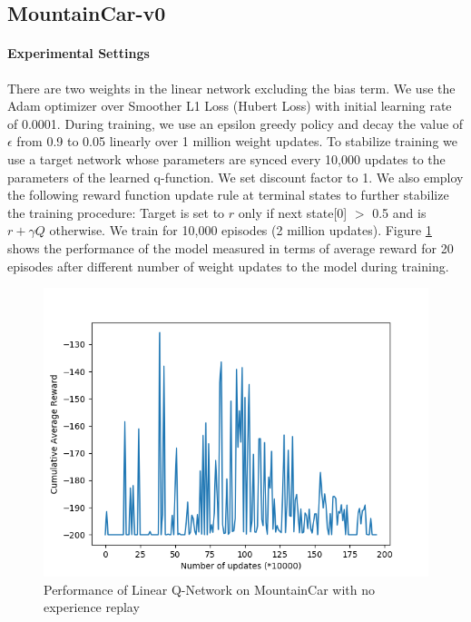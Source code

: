 \documentclass[12pt]{article}
\begin{document}
\pagebreak[4]
\subsection*{MountainCar-v0}
\paragraph{Experimental Settings} There are two weights in the linear network excluding the bias term. We use the Adam optimizer over Smoother L1 Loss (Hubert Loss) with initial learning rate of 0.0001. During training, we use an epsilon greedy policy and decay the value of $\epsilon$ from 0.9 to 0.05 linearly over 1 million weight updates. To stabilize training we use a target network whose parameters are synced every 10,000 updates to the parameters of the learned q-function. We set discount factor to 1. We also employ the following reward function update rule at terminal states to further stabilize the training procedure:  Target is set to $r$ only if next state[0] $>$ 0.5 and is $r+γQ$ otherwise. We train for 10,000 episodes (2 million updates). Figure \ref{fig:mn02} shows the performance of the model measured in terms of average reward for 20 episodes after different number of weight updates to the model during training.\\

\begin{figure}[h]
  \centering
  \vspace{-5mm}
  \includegraphics[width=0.8\linewidth]{figures/linear_noexp_hubert_target_reward_plot.png}
  \caption{Performance of Linear Q-Network on MountainCar with no experience replay}
  \label{fig:mn02}
\end{figure}
\end{document}
